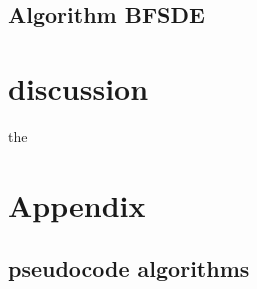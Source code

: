 \documentclass[letterpaper,10pt,english]{jupyterBook}
\begin{document}
\subsection{Algorithm BFSDE}
\label{\detokenize{Financial_application:algorithm-bfsde}}
\sphinxAtStartPar



\section{discussion}
\label{\detokenize{Discussion:discussion}}\label{\detokenize{Discussion::doc}}
\sphinxAtStartPar
the


\section{Appendix}
\label{\detokenize{Appendix:appendix}}\label{\detokenize{Appendix::doc}}

\subsection{pseudocode algorithms}
\label{\detokenize{Appendix:pseudocode-algorithms}}
\sphinxAtStartPar
{}

\sphinxAtStartPar
{}
\end{document}
